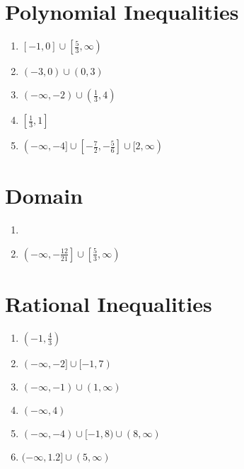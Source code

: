\section*{Polynomial Inequalities}
\begin{enumerate}
    \item $[-1,0] \cup \left[\frac{5}{3}, \infty\right)$
    \item $(-3,0) \cup (0,3)$
    \item $(-\infty, -2) \cup \left(\frac{1}{3}, 4\right)$
    \item $\left[\frac{1}{3}, 1\right]$
    \item $(-\infty, -4] \cup \left[-\frac{7}{2},-\frac{5}{6}\right] \cup [2, \infty)$
\end{enumerate}

\section*{Domain}
\begin{enumerate}
	\item \item $\left(-\infty, -\frac{12}{21}\right] \cup \left[\frac{5}{3}, \infty\right)$
\end{enumerate}

\section*{Rational Inequalities}
\begin{enumerate}
    \item $\left(-1, \frac{4}{3}\right)$
    \item $(-\infty,-2] \cup [-1, 7)$
    \item $(-\infty, -1) \cup (1, \infty)$
    \item $(-\infty, 4)$
    \item $(-\infty, -4) \cup [-1, 8) \cup (8, \infty)$
    \item $(-\infty, 1.2] \cup (5, \infty)$
\end{enumerate}